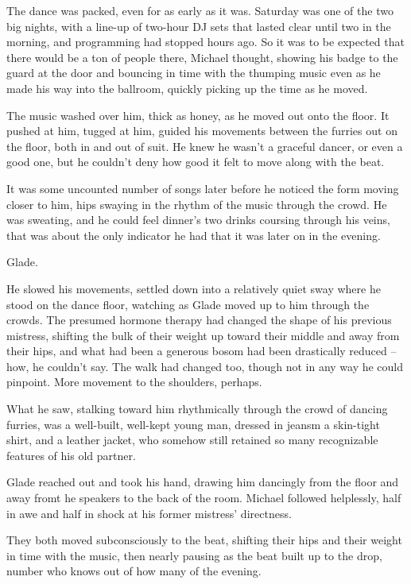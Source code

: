 The dance was packed, even for as early as it was.  Saturday was one of the two big nights, with a line-up of two-hour DJ sets that lasted clear until two in the morning, and programming had stopped hours ago.  So it was to be expected that there would be a ton of people there, Michael thought, showing his badge to the guard at the door and bouncing in time with the thumping music even as he made his way into the ballroom, quickly picking up the time as he moved.

The music washed over him, thick as honey, as he moved out onto the floor.  It pushed at him, tugged at him, guided his movements between the furries out on the floor, both in and out of suit.  He knew he wasn't a graceful dancer, or even a good one, but he couldn't deny how good it felt to move along with the beat.

It was some uncounted number of songs later before he noticed the form moving closer to him, hips swaying in the rhythm of the music through the crowd.  He was sweating, and he could feel dinner's two drinks coursing through his veins, that was about the only indicator he had that it was later on in the evening.

Glade.

He slowed his movements, settled down into a relatively quiet sway where he stood on the dance floor, watching as Glade moved up to him through the crowds.  The presumed hormone therapy had changed the shape of his previous mistress, shifting the bulk of their weight up toward their middle and away from their hips, and what had been a generous bosom had been drastically reduced -- how, he couldn't say.  The walk had changed too, though not in any way he could pinpoint.  More movement to the shoulders, perhaps.

What he saw, stalking toward him rhythmically through the crowd of dancing furries, was a well-built, well-kept young man, dressed in jeansm a skin-tight shirt, and a leather jacket, who somehow still retained so many recognizable features of his old partner.

Glade reached out and took his hand, drawing him dancingly from the floor and away fromt he speakers to the back of the room.  Michael followed helplessly, half in awe and half in shock at his former mistress' directness.

They both moved subconsciously to the beat, shifting their hips and their weight in time with the music, then nearly pausing as the beat built up to the drop, number who knows out of how many of the evening.

